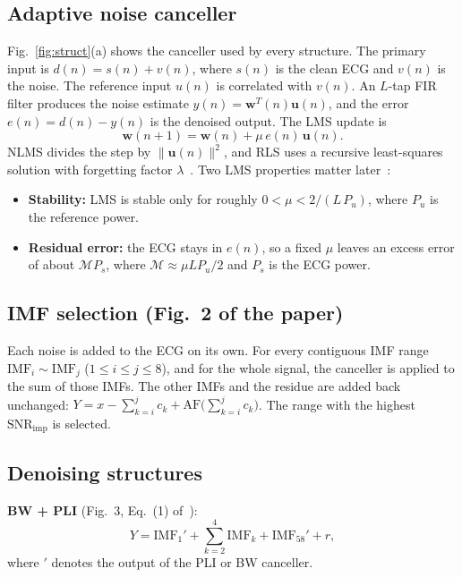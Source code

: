 \documentclass[11pt,a4paper]{article}
\newcommand{\imf}[1]{\mathrm{IMF}_{#1}}
\newcommand{\snrimp}{\mathrm{SNR}_\mathrm{imp}}
\begin{document}
\subsection{Adaptive noise canceller}
Fig.~\ref{fig:struct}(a) shows the canceller used by every structure. The primary input is
$d(n) = s(n) + v(n)$, where $s(n)$ is the clean ECG and $v(n)$ is the noise. The reference input $u(n)$ is correlated
with $v(n)$. An $L$-tap FIR filter produces the noise estimate $y(n)=\mathbf{w}^{T}(n)\mathbf{u}(n)$, and the error
$e(n)=d(n)-y(n)$ is the denoised output. The LMS update is
\begin{equation}
  \mathbf{w}(n{+}1)=\mathbf{w}(n)+\mu\, e(n)\,\mathbf{u}(n). \label{eq:lms}
\end{equation}
NLMS divides the step by $\|\mathbf{u}(n)\|^2$, and RLS uses a recursive least-squares solution with forgetting factor
$\lambda$~\cite{haykin}. Two LMS properties matter later~\cite{haykin}:
\begin{itemize}
  \item \textbf{Stability:} LMS is stable only for roughly $0<\mu<2/(L\,P_u)$, where $P_u$ is the reference power.
  \item \textbf{Residual error:} the ECG stays in $e(n)$, so a fixed $\mu$ leaves an excess error of about
        $\mathcal{M}P_s$, where $\mathcal{M}\approx\mu LP_u/2$ and $P_s$ is the ECG power.
\end{itemize}

\subsection{IMF selection (Fig.~2 of the paper)}
Each noise is added to the ECG on its own. For every contiguous IMF range $\imf{i}\!\sim\!\imf{j}$
($1\le i\le j\le 8$), and for the whole signal, the canceller is applied to the sum of those IMFs. The other IMFs and
the residue are added back unchanged: $Y = x - \sum_{k=i}^{j} c_k + \mathrm{AF}\big(\sum_{k=i}^{j} c_k\big)$. The
range with the highest $\snrimp$ is selected.

\subsection{Denoising structures}
\textbf{BW + PLI} (Fig.~3, Eq.~(1) of~\cite{dai}):
\begin{equation}
  Y = \imf{1}' + \textstyle\sum_{k=2}^{4}\imf{k} + \imf{58}' + r,
\end{equation}
where $'$ denotes the output of the PLI or BW canceller.
\end{document}
